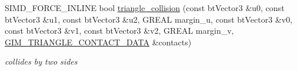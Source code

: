 \begin{DoxyCompactItemize}
\mbox{\label{classGIM__TRIANGLE__CALCULATION__CACHE_ae9c1727c7a906900043eab45b25cbf50}} 
S\+I\+M\+D\+\_\+\+F\+O\+R\+C\+E\+\_\+\+I\+N\+L\+I\+NE bool \hyperlink{classGIM__TRIANGLE__CALCULATION__CACHE_ae9c1727c7a906900043eab45b25cbf50}{triangle\+\_\+collision} (const bt\+Vector3 \&u0, const bt\+Vector3 \&u1, const bt\+Vector3 \&u2, G\+R\+E\+AL margin\+\_\+u, const bt\+Vector3 \&v0, const bt\+Vector3 \&v1, const bt\+Vector3 \&v2, G\+R\+E\+AL margin\+\_\+v, \hyperlink{structGIM__TRIANGLE__CONTACT__DATA}{G\+I\+M\+\_\+\+T\+R\+I\+A\+N\+G\+L\+E\+\_\+\+C\+O\+N\+T\+A\+C\+T\+\_\+\+D\+A\+TA} \&contacts)
\begin{DoxyCompactList}\small\item\em collides by two sides \end{DoxyCompactList}\end{DoxyCompactItemize}
